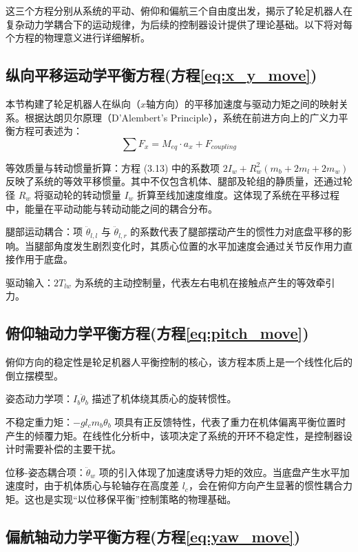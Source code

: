 这三个方程分别从系统的平动、俯仰和偏航三个自由度出发，揭示了轮足机器人在复杂动力学耦合下的运动规律，为后续的控制器设计提供了理论基础。以下将对每个方程的物理意义进行详细解析。

\subsection{纵向平移运动学平衡方程(方程\ref{eq:x_y_move})}

本节构建了轮足机器人在纵向（$x$轴方向）的平移加速度与驱动力矩之间的映射关系。根据达朗贝尔原理（D'Alembert's Principle），系统在前进方向上的广义力平衡方程可表述为：$$\sum F_x = M_{eq} \cdot a_x + F_{coupling}$$

等效质量与转动惯量折算：方程 (3.13) 中的系数项 $2I_w + R_{w}^{2}(m_b + 2m_l + 2m_w)$ 反映了系统的等效平移惯量。其中不仅包含机体、腿部及轮组的静质量，还通过轮径 $R_w$ 将驱动轮的转动惯量 $I_w$ 折算至线加速度维度。这体现了系统在平移过程中，能量在平动动能与转动动能之间的耦合分布。

腿部运动耦合：项 $\ddot{\theta}_{l,l}$ 与 $\ddot{\theta}_{l,r}$ 的系数代表了腿部摆动产生的惯性力对底盘平移的影响。当腿部角度发生剧烈变化时，其质心位置的水平加速度会通过关节反作用力直接作用于底盘。

驱动输入：$2T_{lw}$ 为系统的主动控制量，代表左右电机在接触点产生的等效牵引力。

\subsection{俯仰轴动力学平衡方程(方程\ref{eq:pitch_move})}

俯仰方向的稳定性是轮足机器人平衡控制的核心，该方程本质上是一个线性化后的倒立摆模型。

姿态动力学项：$I_b \ddot{\theta}_b$ 描述了机体绕其质心的旋转惯性。

不稳定重力矩：$-g l_c m_b \theta_b$ 项具有正反馈特性，代表了重力在机体偏离平衡位置时产生的倾覆力矩。在线性化分析中，该项决定了系统的开环不稳定性，是控制器设计时需要补偿的主要干扰。

位移-姿态耦合项：$\ddot{\theta}_{w}$ 项的引入体现了加速度诱导力矩的效应。当底盘产生水平加速度时，由于机体质心与轮轴存在高度差 $l_c$，会在俯仰方向产生显著的惯性耦合力矩。这也是实现“以位移保平衡”控制策略的物理基础。

\subsection{偏航轴动力学平衡方程(方程\ref{eq:yaw_move})}

